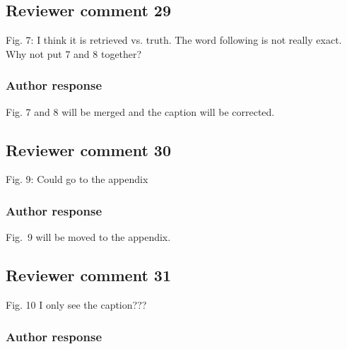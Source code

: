 \documentclass[11pt]{scrartcl}
\begin{document}
\subsection*{Reviewer comment 29}
Fig.  7:  I think it is retrieved vs.  truth.  The word following is not really exact.  Why not put 7 and 8 together?

\subsubsection*{Author response}

Fig. 7 and 8 will be merged and the caption will be corrected.

%

\subsection*{Reviewer comment 30}
Fig. 9: Could go to the appendix

\subsubsection{Author response}
Fig.~9 will be moved to the appendix.

\subsection*{Reviewer comment 31}
Fig. 10 I only see the caption???

\subsubsection*{Author response}
\end{document}

